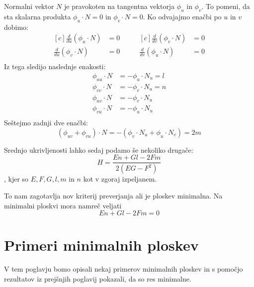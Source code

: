 \documentclass[mat1]{fmfdelo}
\begin{document}
\begin{dokaz}
    Normalni vektor $N$ je pravokoten na tangentna vektorja $\phi_u$ in $\phi_v$.
    To pomeni, da sta skalarna produkta $\phi_u \cdot N = 0$ in $\phi_v \cdot N = 0$.
    Ko odvajajmo enačbi po $u$ in $v$ dobimo:
    \begin{equation*}
        \begin{aligned}[c]
            \frac{d}{du}(\phi_u \cdot N) &= 0 \\
            \frac{d}{du}(\phi_v \cdot N) &= 0 \\
        \end{aligned}
        \qquad
        \begin{aligned}[c]
            \frac{d}{dv}(\phi_v \cdot N) &= 0 \\
            \frac{d}{dv}(\phi_u \cdot N) &= 0 \\    
        \end{aligned}
    \end{equation*}
    Iz tega sledijo naslednje enakosti:
    \begin{align*}
        \phi_{uu} \cdot N &= - \phi_u \cdot N_u = l \\
        \phi_{vv} \cdot N &= - \phi_v \cdot N_u = n \\
        \phi_{uv} \cdot N &= - \phi_v \cdot N_u  \\
        \phi_{vu} \cdot N &= - \phi_u \cdot N_u  \\
    \end{align*}
    Seštejmo zadnji dve enačbi:
    $$ (\phi_{uv} + \phi_{vu}) \cdot N = - (\phi_v \cdot N_u + \phi_u \cdot N_v) = 2m $$
\end{dokaz}


Srednjo ukrivljenosti lahko sedaj podamo še nekoliko drugače:
$$ H = \frac{En + Gl - 2Fm}{2(EG - F^2)} $$,
kjer so $E, F, G, l, m \text{ in } n$ kot v zgoraj izpeljanem.

To nam zagotavlja nov kriterij preverjanja ali je ploskev minimalna. Na minimalni ploskvi mora namreč veljati $$En + Gl - 2Fm = 0$$


\section{Primeri minimalnih ploskev}

V tem poglavju bomo opisali nekaj primerov minimalnih ploskev in s pomočjo rezultatov iz prejšnjih poglavij pokazali, da 
so res minimalne.
\end{document}
